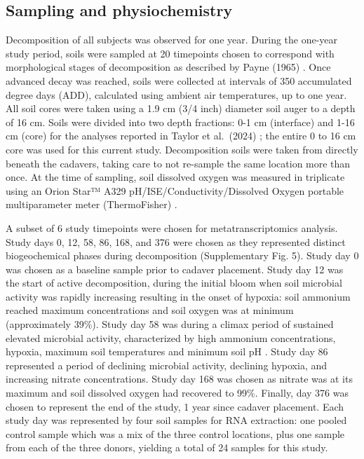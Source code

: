 \documentclass[
  sn-nature,
  lineno, referee]{sn-jnl}
\begin{document}
\subsection{Sampling and
physiochemistry}\label{sampling-and-physiochemistry}

Decomposition of all subjects was observed for one year. During the
one-year study period, soils were sampled at 20 timepoints chosen to
correspond with morphological stages of decomposition as described by
Payne (1965) \citep{payne_summer_1965}. Once advanced decay was reached,
soils were collected at intervals of 350 accumulated degree days (ADD),
calculated using ambient air temperatures, up to one year. All soil
cores were taken using a 1.9 cm (3/4 inch) diameter soil auger to a
depth of 16 cm. Soils were divided into two depth fractions: 0-1 cm
(interface) and 1-16 cm (core) for the analyses reported in Taylor et
al.~(2024) \citep{taylor_transient_2024}; the entire 0 to 16 cm core was
used for this current study. Decomposition soils were taken from
directly beneath the cadavers, taking care to not re-sample the same
location more than once. At the time of sampling, soil dissolved oxygen
was measured in triplicate using an Orion Star™ A329
pH/ISE/Conductivity/Dissolved Oxygen portable multiparameter meter
(ThermoFisher) \citep{taylor_transient_2024}.

A subset of 6 study timepoints were chosen for metatranscriptomics
analysis. Study days 0, 12, 58, 86, 168, and 376 were chosen as they
represented distinct biogeochemical phases during decomposition
(Supplementary Fig. 5). Study day 0 was chosen as a baseline sample
prior to cadaver placement. Study day 12 was the start of active
decomposition, during the initial bloom when soil microbial activity was
rapidly increasing resulting in the onset of hypoxia: soil ammonium
reached maximum concentrations and soil oxygen was at minimum
(approximately 39\%). Study day 58 was during a climax period of
sustained elevated microbial activity, characterized by high ammonium
concentrations, hypoxia, maximum soil temperatures and minimum soil pH
\citep{taylor_transient_2024}. Study day 86 represented a period of
declining microbial activity, declining hypoxia, and increasing nitrate
concentrations. Study day 168 was chosen as nitrate was at its maximum
and soil dissolved oxygen had recovered to 99\%. Finally, day 376 was
chosen to represent the end of the study, 1 year since cadaver
placement. Each study day was represented by four soil samples for RNA
extraction: one pooled control sample which was a mix of the three
control locations, plus one sample from each of the three donors,
yielding a total of 24 samples for this study.
\end{document}
